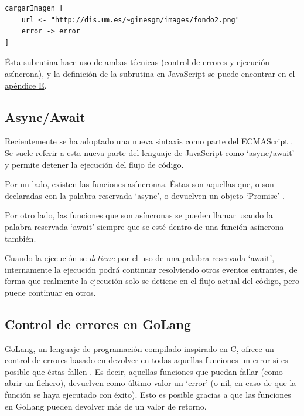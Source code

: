 \documentclass{report}
\begin{document}
		\vspace{10px}
	
\begin{BVerbatim}
cargarImagen [
	url <- "http://dis.um.es/~ginesgm/images/fondo2.png"
	error -> error
]
\end{BVerbatim}

	Ésta subrutina hace uso de ambas técnicas (control de errores y ejecución asíncrona), y la definición de la subrutina en JavaScript se puede encontrar en el \hyperref[app:e]{apéndice E}.
	
	\subsection{Async/Await}
	
	Recientemente se ha adoptado una nueva sintaxis como parte del ECMAScript \cite{ecmascript-asyncawait}. Se suele referir a esta nueva parte del lenguaje de JavaScript como `async/await' y permite detener la ejecución del flujo de código. 
	
	Por un lado, existen las funciones asíncronas. Éstas son aquellas que, o son declaradas con la palabra reservada `async', o devuelven un objeto `Promise' \cite{javascript-promise}. 
	
	Por otro lado, las funciones que son asíncronas se pueden llamar usando la palabra reservada `await' siempre que se esté dentro de una función asíncrona también. 
	
	\vspace{10px}
	
	Cuando la ejecución se \textit{detiene} por el uso de una palabra reservada `await', internamente la ejecución podrá continuar resolviendo otros eventos entrantes, de forma que realmente la ejecución solo se detiene en el flujo actual del código, pero puede continuar en otros. 
	
	\subsection{Control de errores en GoLang}
	
	GoLang, un lenguaje de programación compilado inspirado en C, ofrece un control de errores basado en devolver en todas aquellas funciones un error si es posible que éstas fallen \cite{golang-error}. Es decir, aquellas funciones que puedan fallar (como abrir un fichero), devuelven como último valor un `error' (o nil, en caso de que la función se haya ejecutado con éxito). Esto es posible gracias a que las funciones en GoLang pueden devolver más de un valor de retorno. 
	
\end{document}
